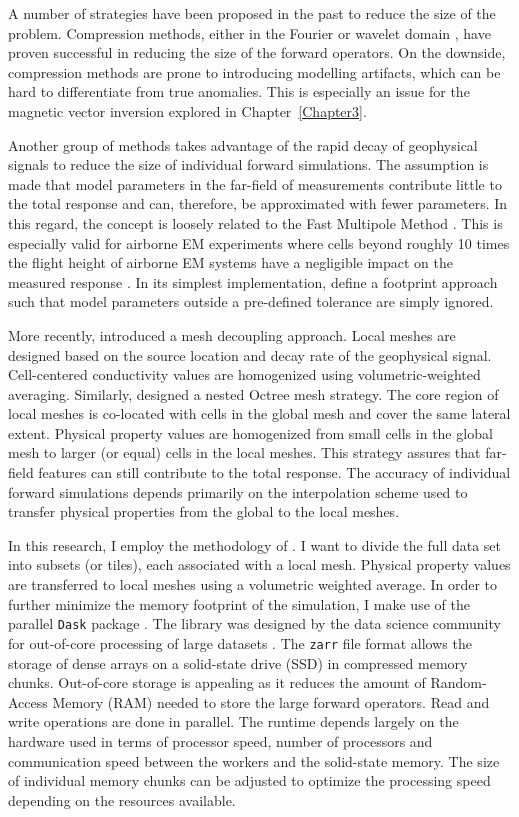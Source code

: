 A number of strategies have been proposed in the past to reduce the size of the problem. Compression methods, either in the Fourier \cite[]{Pilkington97} or wavelet domain \cite{LiOldenburg03}, have proven successful in reducing the size of the forward operators. On the downside, compression methods are prone to introducing modelling artifacts, which can be hard to differentiate from true anomalies. This is especially an issue for the magnetic vector inversion explored in Chapter~\ref{Chapter3}.

Another group of methods takes advantage of the rapid decay of geophysical signals to reduce the size of individual forward simulations. The assumption is made that model parameters in the far-field of measurements contribute little to the total response and can, therefore, be approximated with fewer parameters. In this regard, the concept is loosely related to the Fast Multipole Method \cite[]{Engheta1992}. This is especially valid for airborne EM experiments where cells beyond roughly 10 times the flight height of airborne EM systems have a negligible impact on the measured response \cite[]{Reid2006}. In its simplest implementation, \cite[]{Cox2010} define a footprint approach such that model parameters outside a pre-defined tolerance are simply ignored.

More recently, \cite{Yang2014} introduced a mesh decoupling approach. Local meshes are designed based on the source location and decay rate of the geophysical signal. Cell-centered conductivity values are homogenized using volumetric-weighted averaging. Similarly, \cite{Haber2014} designed a nested Octree mesh strategy. The core region of local meshes is co-located with cells in the global mesh and cover the same lateral extent. Physical property values are homogenized from small cells in the global mesh to larger (or equal) cells in the local meshes. This strategy assures that far-field features can still contribute to the total response. The accuracy of individual forward simulations depends primarily on the interpolation scheme used to transfer physical properties from the global to the local meshes.

In this research, I employ the methodology of \cite{Haber2014}. I want to divide the full data set into subsets (or tiles), each associated with a local mesh. Physical property values are transferred to local meshes using a volumetric weighted average. In order to further minimize the memory footprint of the simulation, I make use of the parallel \texttt{Dask} package \cite[]{dask2016}. The library was designed by the data science community for out-of-core processing of large datasets \cite[]{Scipy2015}. The \texttt{zarr} file format allows the storage of dense arrays on a solid-state drive (SSD) in compressed memory chunks. Out-of-core storage is appealing as it reduces the amount of Random-Access Memory (RAM) needed to store the large forward operators. Read and write operations are done in parallel. The runtime depends largely on the hardware used in terms of processor speed, number of processors and communication speed between the workers and the solid-state memory. The size of individual memory chunks can be adjusted to optimize the processing speed depending on the resources available.

